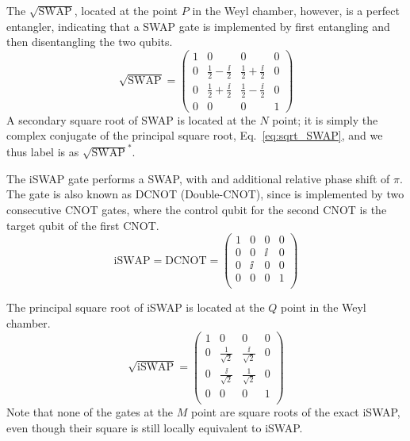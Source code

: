   The $\sqrt{\text{SWAP}}$, located at the point $P$ in the Weyl chamber,
  however, is a perfect entangler, indicating that
  a SWAP gate is implemented by first entangling and then disentangling the two
  qubits.
  \begin{equation}
  \sqrt{\text{SWAP}}=
    \begin{pmatrix}
    1 & 0 & 0 & 0 \\
    0 & \frac{1}{2}-\frac{\ii}{2} & \frac{1}{2}+\frac{\ii}{2} & 0 \\
    0 & \frac{1}{2}+\frac{\ii}{2} & \frac{1}{2}-\frac{\ii}{2} & 0 \\
    0 & 0 & 0 & 1
    \end{pmatrix}
    \label{eq:sqrt_SWAP}
  \end{equation}
  A secondary square root of SWAP is located at the $N$ point; it is simply
  the complex conjugate of the principal square root, Eq.~\eqref{eq:sqrt_SWAP},
  and we thus label is as $\sqrt{\text{SWAP}}^*$.

  The iSWAP gate performs a SWAP, with and additional relative phase shift
  of $\pi$. The gate is also known  as DCNOT (Double-CNOT), since is
  implemented by two consecutive CNOT gates, where the control qubit for the
  second CNOT is the target qubit of the first CNOT.
  \begin{equation}
  \text{iSWAP} =  \text{DCNOT} =
    \begin{pmatrix}
    1 & 0 & 0 & 0 \\
    0 & 0 & \ii & 0 \\
    0 & \ii & 0 & 0 \\
    0 & 0 & 0 & 1 \\
    \end{pmatrix}
  \end{equation}

  The principal square root of iSWAP is located at the $Q$ point in the Weyl
  chamber.
  \begin{equation}
  \sqrt{\text{iSWAP}} =
    \begin{pmatrix}
    1 & 0 & 0 & 0 \\
    0 & \frac{1}{\sqrt{2}} & \frac{\ii}{\sqrt{2}} & 0 \\
    0 & \frac{\ii}{\sqrt{2}} & \frac{1}{\sqrt{2}} & 0 \\
    0 & 0 & 0 & 1 \\
    \end{pmatrix}
  \end{equation}
  Note that none of the gates at the $M$ point are square roots of the exact
  iSWAP, even though their square is still locally equivalent to iSWAP.


